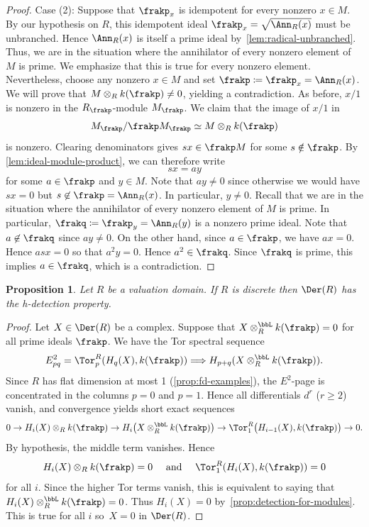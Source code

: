 \documentclass{amsart}
\numberwithin{equation}{section}%
\newtheorem{Prop}[equation]{Proposition}
\theoremstyle{remark}
\begin{document}
\begin{proof}
	Case (2): Suppose that $\frakp_x$ is idempotent for every nonzero $x \in M$. By our hypothesis on $R$, this idempotent ideal $\frakp_x = \sqrt{\Ann_R(x)}$ must be unbranched. Hence $\Ann_R(x)$ is itself a prime ideal by~\cref{lem:radical-unbranched}. Thus, we are in the situation where the annihilator of every nonzero element of $M$ is prime. We emphasize that this is true for every nonzero element. Nevertheless, choose any nonzero $x \in M$ and set $\frakp \coloneqq \frakp_x = \Ann_R(x)$. We will prove that $M \otimes_R k(\frakp)\neq 0$, yielding a contradiction. As before, $x/1$ is nonzero in the $R_{\frakp}$-module $M_{\frakp}$. We claim that the image of $x/1$ in
	\[
		M_\frakp/\frakp M_\frakp \simeq M\otimes_R k(\frakp)
	\]
	is nonzero. Clearing denominators gives $sx \in \frakp M$ for some $s \notin \frakp$. By \cref{lem:ideal-module-product}, we can therefore write
	\begin{equation}
		sx = ay
	\end{equation}
	for some $a \in \frakp$ and $y \in M$. Note that $ay\neq 0$ since otherwise we would have $sx=0$ but $s \not\in\frakp=\Ann_R(x)$. In particular, $y \neq 0$. Recall that we are in the situation where the annihilator of every nonzero element of $M$ is prime. In particular, $\frakq \coloneqq \frakp_{y} = \Ann_R(y)$ is a nonzero prime ideal. Note that $a \not\in \frakq$ since $ay\neq 0$. On the other hand, since $a \in \frakp$, we have $ax=0$. Hence $asx=0$ so that $a^2y=0$. Hence $a^2 \in \frakq$. Since $\frakq$ is prime, this implies $a \in \frakq$, which is a contradiction.
\end{proof}

\begin{Prop}\label{prop:detection-for-complexes}
	Let $R$ be a valuation domain. If $R$ is discrete then $\Der(R)$ has the h-detection property.
\end{Prop}

\begin{proof}
	Let $X \in \Der(R)$ be a complex. Suppose that $X \otimes_R^{\bbL} k(\frakp) = 0$ for all prime ideals $\frakp$. We have the Tor spectral sequence 
	\[
		E_{pq}^2 = \Tor^R_p(H_q(X),k(\frakp)) \Longrightarrow H_{p+q}(X \otimes_R^{\bbL} k(\frakp)).
	\]
	Since $R$ has flat dimension at most 1 (\cref{prop:fd-examples}), the $E^2$-page is concentrated in the columns $p=0$ and $p=1$. Hence all differentials $d^r$ ($r \ge 2$) vanish, and convergence yields short exact sequences
	\[
		0 \to H_i(X) \otimes_R k(\frakp) \to H_i\big(X \otimes_R^{\bbL} k(\frakp)\big) \to \Tor_1^R\big(H_{i-1}(X),k(\frakp)\big) \to 0.
	\]
	By hypothesis, the middle term vanishes. Hence
	\[
		H_i(X) \otimes_R k(\frakp) = 0 \quad\text{ and }\quad \Tor_1^R(H_{i}(X),k(\frakp)) = 0
	\]
	for all $i$. Since the higher Tor terms vanish, this is equivalent to saying that $H_i(X) \otimes_R^{\bbL} k(\frakp) = 0$. Thus $H_i(X) = 0$ by~\cref{prop:detection-for-modules}. This is true for all $i$ so~$X=0$ in $\Der(R)$. 
\end{proof}
\end{document}
